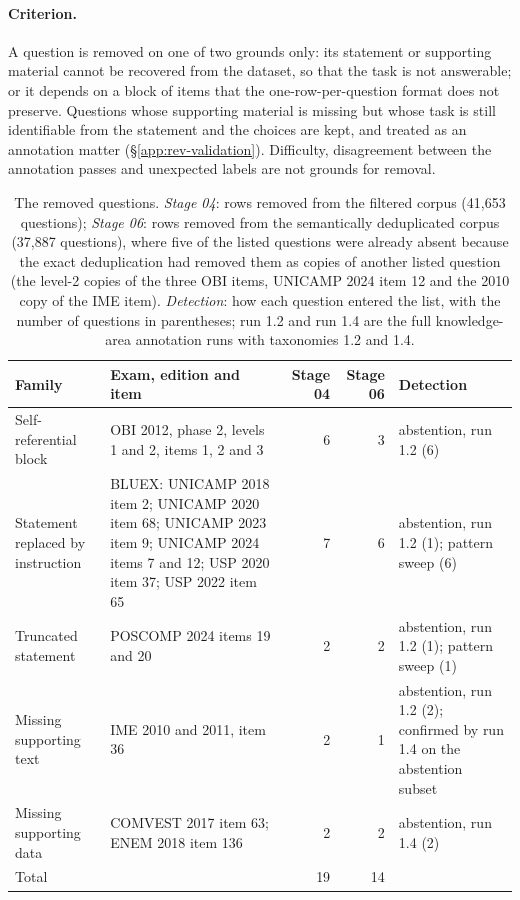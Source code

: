 \paragraph{Criterion.} A question is removed on one of two grounds only: its
statement or supporting material cannot be recovered from the dataset, so
that the task is not answerable; or it depends on a block of items that the
one-row-per-question format does not preserve. Questions whose supporting
material is missing but whose task is still identifiable from the statement
and the choices are kept, and treated as an annotation matter
(\S\ref{app:rev-validation}). Difficulty, disagreement between the annotation
passes and unexpected labels are not grounds for removal.

\begin{table}[t]
\centering
\footnotesize
\setlength{\tabcolsep}{4pt}
\begin{tabular}{@{}lp{6.6cm}rrp{4.2cm}@{}}
\toprule
Family & Exam, edition and item & Stage 04 & Stage 06 & Detection \\
\midrule
Self-referential block & OBI 2012, phase 2, levels 1 and 2, items 1, 2 and 3 & 6 & 3 & abstention, run 1.2 (6) \\
Statement replaced by instruction & BLUEX: UNICAMP 2018 item 2; UNICAMP 2020 item 68; UNICAMP 2023 item 9; UNICAMP 2024 items 7 and 12; USP 2020 item 37; USP 2022 item 65 & 7 & 6 & abstention, run 1.2 (1); pattern sweep (6) \\
Truncated statement & POSCOMP 2024 items 19 and 20 & 2 & 2 & abstention, run 1.2 (1); pattern sweep (1) \\
Missing supporting text & IME 2010 and 2011, item 36 & 2 & 1 & abstention, run 1.2 (2); confirmed by run 1.4 on the abstention subset \\
Missing supporting data & COMVEST 2017 item 63; ENEM 2018 item 136 & 2 & 2 & abstention, run 1.4 (2) \\
\midrule
Total & & 19 & 14 & \\
\bottomrule
\end{tabular}
\caption{The removed questions. \emph{Stage 04}: rows removed from the filtered corpus (41,653 questions); \emph{Stage 06}: rows removed from the semantically deduplicated corpus (37,887 questions), where five of the listed questions were already absent because the exact deduplication had removed them as copies of another listed question (the level-2 copies of the three OBI items, UNICAMP 2024 item 12 and the 2010 copy of the IME item). \emph{Detection}: how each question entered the list, with the number of questions in parentheses; run 1.2 and run 1.4 are the full knowledge-area annotation runs with taxonomies 1.2 and 1.4.}
\label{tab:rev-removed}
\end{table}

